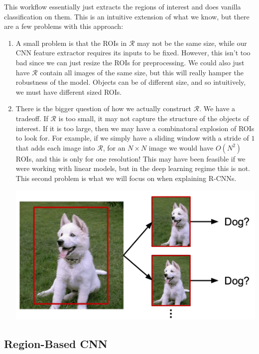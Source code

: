   This workflow essentially just extracts the regions of interest and does vanilla classification on them. This is an intuitive extension of what we know, but there are a few problems with this approach: 
  \begin{enumerate}
    \item A small problem is that the ROIs in $\mathcal{R}$ may not be the same size, while our CNN feature extractor requires its inputs to be fixed. However, this isn't too bad since we can just resize the ROIs for preprocessing. We could also just have $\mathcal{R}$ contain all images of the same size, but this will really hamper the robustness of the model. Objects can be of different size, and so intuitively, we must have different sized ROIs. 

    \item There is the bigger question of how we actually construct $\mathcal{R}$. We have a tradeoff. If $\mathcal{R}$ is too small, it may not capture the structure of the objects of interest. If it is too large, then we may have a combinatoral explosion of ROIs to look for. For example, if we simply have a sliding window with a stride of $1$ that adds each image into $\mathcal{R}$, for an $N \times N$ image we would have $O(N^2)$ ROIs, and this is only for one resolution! This may have been feasible if we were working with linear models, but in the deep learning regime this is not. This second problem is what we will focus on when explaining R-CNNs. 
    
      \begin{center}
        \includegraphics[scale=0.3]{img/sliding_window.png}
      \end{center}
  \end{enumerate}

\subsection{Region-Based CNN}

